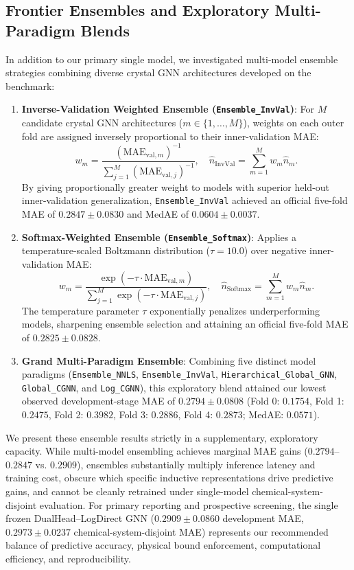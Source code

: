 \documentclass[journal,article,submit,moreauthors,pdftex]{article}
\begin{document}
\subsection{Frontier Ensembles and Exploratory Multi-Paradigm Blends}
In addition to our primary single model, we investigated multi-model ensemble strategies combining diverse crystal GNN architectures developed on the benchmark:
\begin{enumerate}
    \item \textbf{Inverse-Validation Weighted Ensemble (\texttt{Ensemble\_InvVal})}: For $M$ candidate crystal GNN architectures ($m \in \{1, \dots, M\}$), weights on each outer fold are assigned inversely proportional to their inner-validation MAE:
    \begin{equation}
        w_m = \frac{(\mathrm{MAE}_{\mathrm{val}, m})^{-1}}{\sum_{j=1}^M (\mathrm{MAE}_{\mathrm{val}, j})^{-1}}, \quad \hat{n}_{\mathrm{InvVal}} = \sum_{m=1}^M w_m \hat{n}_m.
    \end{equation}
    By giving proportionally greater weight to models with superior held-out inner-validation generalization, \texttt{Ensemble\_InvVal} achieved an official five-fold MAE of $0.2847 \pm 0.0830$ and MedAE of $0.0604 \pm 0.0037$.
    \item \textbf{Softmax-Weighted Ensemble (\texttt{Ensemble\_Softmax})}: Applies a temperature-scaled Boltzmann distribution ($\tau = 10.0$) over negative inner-validation MAE:
    \begin{equation}
        w_m = \frac{\exp(-\tau \cdot \mathrm{MAE}_{\mathrm{val}, m})}{\sum_{j=1}^M \exp(-\tau \cdot \mathrm{MAE}_{\mathrm{val}, j})}, \quad \hat{n}_{\mathrm{Softmax}} = \sum_{m=1}^M w_m \hat{n}_m.
    \end{equation}
    The temperature parameter $\tau$ exponentially penalizes underperforming models, sharpening ensemble selection and attaining an official five-fold MAE of $0.2825 \pm 0.0828$.
    \item \textbf{Grand Multi-Paradigm Ensemble}: Combining five distinct model paradigms (\texttt{Ensemble\_NNLS}, \texttt{Ensemble\_InvVal}, \texttt{Hierarchical\_Global\_GNN}, \texttt{Global\_CGNN}, and \texttt{Log\_CGNN}), this exploratory blend attained our lowest observed development-stage MAE of $0.2794 \pm 0.0808$ (Fold 0: $0.1754$, Fold 1: $0.2475$, Fold 2: $0.3982$, Fold 3: $0.2886$, Fold 4: $0.2873$; MedAE: $0.0571$).
\end{enumerate}

We present these ensemble results strictly in a supplementary, exploratory capacity. While multi-model ensembling achieves marginal MAE gains ($0.2794$--$0.2847$ vs. $0.2909$), ensembles substantially multiply inference latency and training cost, obscure which specific inductive representations drive predictive gains, and cannot be cleanly retrained under single-model chemical-system-disjoint evaluation. For primary reporting and prospective screening, the single frozen DualHead--LogDirect GNN ($0.2909 \pm 0.0860$ development MAE, $0.2973 \pm 0.0237$ chemical-system-disjoint MAE) represents our recommended balance of predictive accuracy, physical bound enforcement, computational efficiency, and reproducibility.
\end{document}

